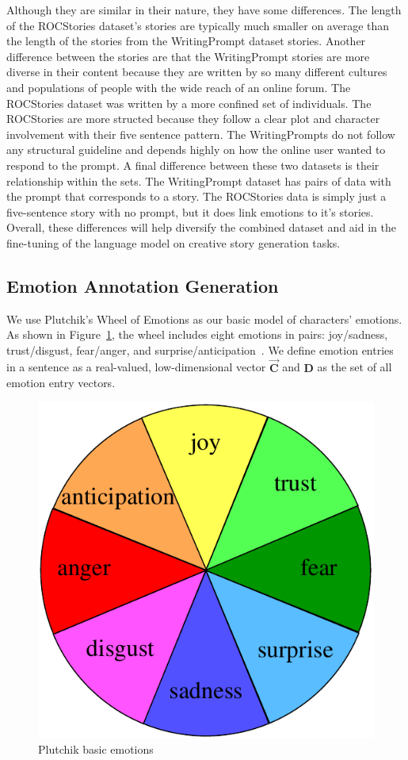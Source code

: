 \documentclass{article} %
\begin{document}
Although they are similar in their nature, they have some differences. The length of the ROCStories dataset's stories are typically much smaller on average than the length of the stories from the WritingPrompt dataset stories. Another difference between the stories are that the WritingPrompt stories are more diverse in their content because they are written by so many different cultures and populations of people with the wide reach of an online forum. The ROCStories dataset was written by a more confined set of individuals. The ROCStories are more structed because they follow a clear plot and character involvement with their five sentence pattern. The WritingPrompts do not follow any structural guideline and depends highly on how the online user wanted to respond to the prompt. A final difference between these two datasets is their relationship within the sets. The WritingPrompt dataset has pairs of data with the prompt that corresponds to a story. The ROCStories data is simply just a five-sentence story with no prompt, but it does link emotions to it's stories. Overall, these differences will help diversify the combined dataset and aid in the fine-tuning of the language model on creative story generation tasks. 

\subsection{Emotion Annotation Generation}
We use Plutchik's Wheel of Emotions as our basic model of characters' emotions. As shown in Figure~\ref{fig:plutchikLabel}, the wheel includes eight emotions in pairs: joy/sadness, trust/disgust, fear/anger, and surprise/anticipation~\cite{plutchik1980general}. We define emotion entries in a sentence as a real-valued, low-dimensional vector $\vec{\mathbf{C}}$ and $\mathbf{D}$ as the set of all emotion entry vectors.

\begin{figure}
    \centering
    \includegraphics[width = 0.3\linewidth]{figure/plutchikWheel.pdf}
    \caption{Plutchik basic emotions}
    \label{fig:plutchikLabel}
\end{figure}
\end{document}

